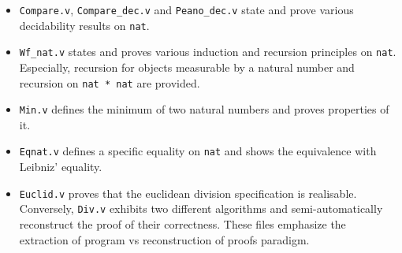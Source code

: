 \begin{itemize}

\item {\tt Compare.v}, {\tt Compare\_dec.v} and {\tt Peano\_dec.v} state
and prove various decidability results on {\tt nat}.

\item {\tt Wf\_nat.v} states and proves various induction and recursion 
principles on {\tt nat}. Especially, recursion for objects measurable by 
a natural number and recursion on {\tt nat * nat} are provided.

\item {\tt Min.v} defines the minimum of two natural numbers and proves 
properties of it. 

\item {\tt Eqnat.v} defines a specific equality on {\tt nat} and shows 
the equivalence with Leibniz' equality.

\item {\tt Euclid.v} proves that the euclidean
division specification is realisable. Conversely, {\tt Div.v} exhibits
two different algorithms and semi-automatically reconstruct the proof of
their correctness. These files emphasize the extraction of program vs
reconstruction of proofs paradigm.

\end{itemize}
